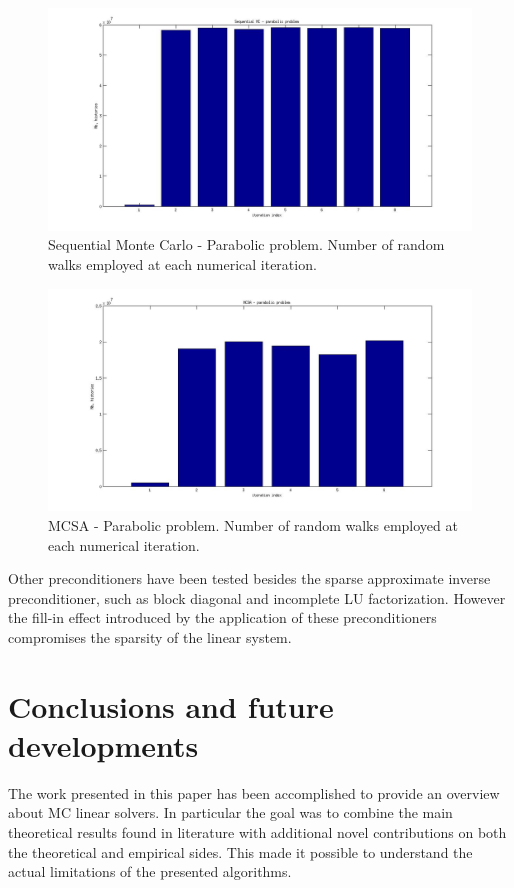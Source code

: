 \documentclass[a4paper,10pt]{article}
\begin{document}
\begin{figure}[h!]
  \centering
    \includegraphics[width=\textwidth]{SEQ_parabolic.jpg}
      \caption{Sequential Monte Carlo - Parabolic problem. Number of random 
walks 
employed at each 
numerical iteration.}
\label{MCSA_parabolic}
\end{figure}


\begin{figure}[h!]
  \centering
    \includegraphics[width=\textwidth]{MCSA_parabolic.jpg}
      \caption{MCSA - Parabolic problem. Number of random walks 
employed at each 
numerical iteration.}
\label{MCSA_parabolic}
\end{figure}



Other preconditioners 
have 
been 
tested besides the sparse approximate inverse preconditioner, such as block 
diagonal 
and incomplete LU factorization. However the fill-in effect introduced by the 
application of 
these preconditioners compromises the sparsity of the linear system.


\section{Conclusions and future developments}
The work presented in this paper has been accomplished to provide an overview 
about MC linear solvers. In particular the goal was to combine the main 
theoretical results found in literature with additional novel contributions on 
both the theoretical and empirical sides. This made it possible to understand 
the actual limitations of the presented algorithms.
\end{document}
